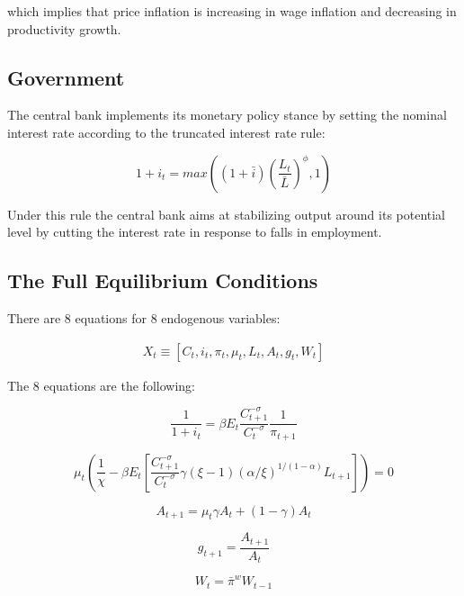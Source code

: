 \documentclass[10pt,math=newtx,citestyle=gb7714-2015,bibstyle=gb7714-2015]{elegantbook}
\begin{document}
{{{	which implies that price inflation is increasing in wage inflation and decreasing in productivity growth.
	
	\subsection{Government}
	
	The central bank implements its monetary policy stance by setting the nominal interest rate according to the truncated interest rate rule:
	
	\begin{equation}
		1+i_t = max \left((1+\bar{i})\left(\frac{L_t}{\bar{L}}\right)^\phi,1\right)
	\end{equation}
	
	Under this rule the central bank aims at stabilizing output around its potential level by cutting the interest rate in response to falls in employment.
	
	\subsection{The Full Equilibrium Conditions}
	
	There are 8 equations for 8 endogenous variables:
	
	$$
	\begin{aligned}
		X_{t} \equiv \left[C_t, i_t, \pi_t, \mu_t, L_t, A_t, g_t, W_t\right]
	\end{aligned}
	$$
	
	The 8 equations are the following:

	\begin{equation}
		\frac{1}{1+i_t} = \beta E_t \frac{C_{t+1}^{-\sigma}}{C_{t}^{-\sigma}}\frac{1}{\pi_{t+1}}
	\end{equation}
	
	\begin{equation}
		\mu_{t}\left(\frac{1}{\chi}-\beta E_{t}\left[\frac{C_{t+1}^{-\sigma}}{C_{t}^{-\sigma}} \gamma (\xi-1)(\alpha / \xi)^{1 /(1-\alpha)} L_{t+1}\right]\right)=0
	\end{equation}
	
	\begin{equation}
A_{t+1} = \mu_t\gamma A_t+(1-\gamma)A_t
	\end{equation}

	
	\begin{equation}
		g_{t+1}=\frac{A_{t+1}}{A_t}
	\end{equation}
	
		\begin{equation}
		W_t = \bar{\pi}^w W_{t-1}
	\end{equation}
	
}}}
\end{document}
